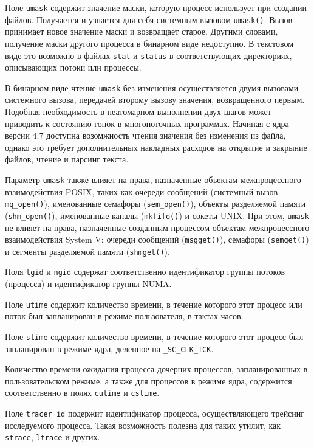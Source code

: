 Поле \texttt{umask} содержит значение маски, которую процесс использует при
создании файлов. Получается и узнается для себя системным вызовом
\texttt{umask()}. Вызов принимает новое значение маски и возвращает старое.
Другими словами, получение маски другого процесса в бинарном виде недоступно.
В текстовом виде это возможно в файлах \texttt{stat} и \texttt{status} в
соответствующих директориях, описывающих потоки или процессы.

В бинарном виде чтение \texttt{umask} без изменения осуществляется двумя
вызовами системного вызова, передачей второму вызову значения, возвращенного
первым. Подобная необходимость в неатомарном выполнении двух шагов может
приводить к состоянию гонок в многопоточных программах. Начиная с ядра версии
4.7 доступна возомжность чтения значения без изменения из файла, однако это
требует дополнительных накладных расходов на открытие и закрыние файлов, чтение
и парсинг текста.

Параметр \texttt{umask} также влияет на права, назначенные объектам
межпроцессного взаимодействия POSIX, таких как очереди сообщений (системный
вызов \texttt{mq\_open()}), именованные семафоры (\texttt{sem\_open()}),
объекты разделяемой памяти (\texttt{shm\_open()}), именованные каналы
(\texttt{mkfifo()}) и сокеты UNIX. При этом, \texttt{umask} не влияет на права,
назначенные созданным процессом объектам межпроцессного взаимодействия System V:
очереди сообщений (\texttt{msgget()}), семафоры (\texttt{semget()}) и сегменты
разделяемой памяти (\texttt{shmget()}).

Поля \texttt{tgid} и \texttt{ngid} содержат соответственно идентификатор группы
потоков (процесса) и идентификатор группы NUMA.

Поле \texttt{utime} содержит количество времени, в течение которого этот процесс
или поток был запланирован в режиме пользователя, в тактах часов.

Поле \texttt{stime} содержит количество времени, в течение которого этот процесс
был запланирован в режиме ядра, деленное на \texttt{\_SC\_CLK\_TCK}.

Количество времени ожидания процесса дочерних процессов, запланированных в
пользовательском режиме, а также для процессов в режиме ядра, содержится
соответственно в полях \texttt{cutime} и \texttt{cstime}.

Поле \texttt{tracer\_id} подержит идентификатор процесса, осуществляющего
трейсинг исследуемого процесса. Такая возможность полезна для таких утилит, как
\texttt{strace}, \texttt{ltrace} и других.

